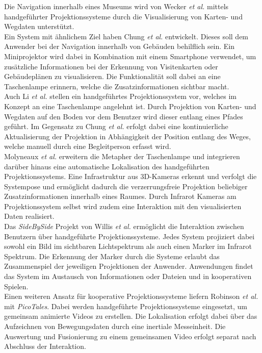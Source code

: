 
Die Navigation innerhalb eines Museums wird von Wecker \textit{et al.} \cite{Wecker2013} mittels handgeführter Projektionssysteme durch die Visualisierung von Karten- und Wegdaten unterstützt.\\
Ein System mit ähnlichem Ziel haben Chung \textit{et al.} \cite{Chung2011} entwickelt. Dieses soll dem Anwender bei der Navigation innerhalb von Gebäuden behilflich sein. Ein Miniprojektor wird dabei in Kombination mit einem Smartphone verwendet, um zusätzliche Informationen bei der Erkennung von Visitenkarten oder Gebäudeplänen zu visualisieren. Die Funktionalität soll dabei an eine Taschenlampe erinnern, welche die Zusatzinformationen sichtbar macht.\\
Auch Li \textit{et al.} \cite{Li2013} stellen ein handgeführtes Projektionssystem vor, welches im Konzept an eine Taschenlampe angelehnt ist. Durch Projektion von Karten- und Wegdaten auf den Boden vor dem Benutzer wird dieser entlang eines Pfades geführt. Im Gegensatz zu Chung \textit{et al.} erfolgt dabei eine kontinuierliche Aktualisierung der Projektion in Abhängigkeit der Position entlang des Weges, welche manuell durch eine Begleitperson erfasst wird.\\
Molyneaux \textit{et al.} \cite{Molyneaux2012} erweitern die Metapher der Taschenlampe und integrieren darüber hinaus eine automatische Lokalisation des handgeführten Projektionssystems. Eine Infrastruktur aus 3D-Kameras erkennt und verfolgt die Systempose und ermöglicht dadurch die verzerrungsfreie Projektion beliebiger Zusatzinformationen innerhalb eines Raumes. Durch Infrarot Kameras am Projektionssystem selbst wird zudem eine Interaktion mit den visualisierten Daten realisiert.\\

Das \textit{SideBySide} Projekt von Willis \textit{et al.} \cite{Willis2011} ermöglicht die Interaktion zwischen Benutzern über handgeführte Projektionssysteme. Jedes System projiziert dabei sowohl ein Bild im sichtbaren Lichtspektrum als auch einen Marker im Infrarot Spektrum. Die Erkennung der Marker durch die Systeme erlaubt das Zusammenspiel der jeweiligen Projektionen der Anwender. Anwendungen findet das System im Austausch von Informationen oder Dateien und in kooperativen Spielen.\\
Einen weiteren Ansatz für kooperative Projektionssysteme liefern Robinson \textit{et al.} \cite{Robinson2012} mit \textit{PicoTales}. Dabei werden handgeführte Projektionssysteme eingesetzt, um gemeinsam animierte Videos zu erstellen. Die Lokalisation erfolgt dabei über das Aufzeichnen von Bewegungsdaten durch eine inertiale Messeinheit. Die Auswertung und Fusionierung zu einem gemeinsamen Video erfolgt separat nach Abschluss der Interaktion.\\

